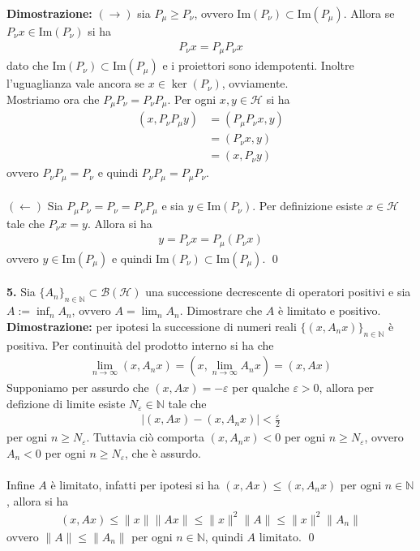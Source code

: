 \documentclass{article}
\numberwithin{equation}{subsection}
\begin{document}
\textbf{Dimostrazione:} $(\rightarrow)$ sia $P_\mu \geq P_\nu$, ovvero $\mathrm{Im}(P_\nu) \subset \mathrm{Im}(P_\mu)$. Allora se $P_\nu x \in \mathrm{Im}(P_\nu)$ si ha
\begin{align*}
    P_\nu x = P_\mu P_\nu x 
\end{align*}
dato che $\mathrm{Im}(P_\nu) \subset \mathrm{Im}(P_\mu)$ e i proiettori sono idempotenti. Inoltre l'uguaglianza vale ancora se $x \in \ker(P_\nu)$, ovviamente. \\
Mostriamo ora che $P_\mu P_\nu = P_\nu P_\mu$. Per ogni $x, y \in \mathcal{H}$ si ha 
\begin{align*}
    (x, P_\nu P_\mu y) &= (P_\mu P_\nu x, y)  \\
    &= (P_\nu x, y)  \\
    &= (x, P_\nu y) 
\end{align*}
ovvero $P_\nu P_\mu = P_\nu$ e quindi $P_\nu P_\mu = P_\mu P_\nu$. \\ \\
$(\leftarrow)$ Sia $P_\mu P_\nu = P_\nu = P_\nu P_\mu$ e sia $y \in \mathrm{Im}(P_\nu)$. Per definizione esiste $x \in \mathcal{H}$ tale che $P_\nu x = y$. Allora si ha 
\begin{align*}
    y = P_\nu x = P_\mu (P_\nu x) 
\end{align*}
ovvero $y \in \mathrm{Im}(P_\mu)$ e quindi $\mathrm{Im}(P_\nu) \subset \mathrm{Im}(P_\mu)$. \qed \\ \\
\textbf{5.} Sia $\{A_n\}_{n \in \mathbb{N}} \subset \mathcal{B}(\mathcal{H})$ una successione decrescente di operatori positivi e sia $A := \inf_n A_n$, ovvero $A = \lim_n A_n$. Dimostrare che $A$ è limitato e positivo. \\

\textbf{Dimostrazione:} per ipotesi la successione di numeri reali $\{(x, A_n x)\}_{n \in \mathbb{N}}$ è positiva. Per continuità del prodotto interno si ha che 
\begin{align*}
    \lim_{n \rightarrow \infty}(x, A_n x) = (x, \lim_{n \rightarrow \infty} A_n x) = (x, A x) 
\end{align*}
Supponiamo per assurdo che $(x, A x) = -\varepsilon$ per qualche $\varepsilon > 0$, allora per defizione di limite esiste $N_\varepsilon \in \mathbb{N}$ tale che 
\begin{align*}
    |(x, Ax) - (x, A_n x)| < \frac{\varepsilon}{2} 
\end{align*}
per ogni $n \geq N_\varepsilon$. Tuttavia ciò comporta $(x, A_n x) < 0$ per ogni $n \geq N_\varepsilon$, ovvero $A_n < 0$ per ogni $n \geq N_\varepsilon$, che è assurdo. \\ \\
Infine $A$ è limitato, infatti per ipotesi si ha $(x, Ax) \leq (x, A_n x)$ per ogni $n \in \mathbb{N}$, allora si ha
\begin{align*}
    (x, Ax) \leq \|x\|\|Ax\| \leq \|x\|^2\|A\| \leq \|x\|^2\|A_n\| 
\end{align*}
ovvero $\|A\| \leq \|A_n\|$ per ogni $n \in \mathbb{N}$, quindi $A$ limitato. \qed
\end{document}
